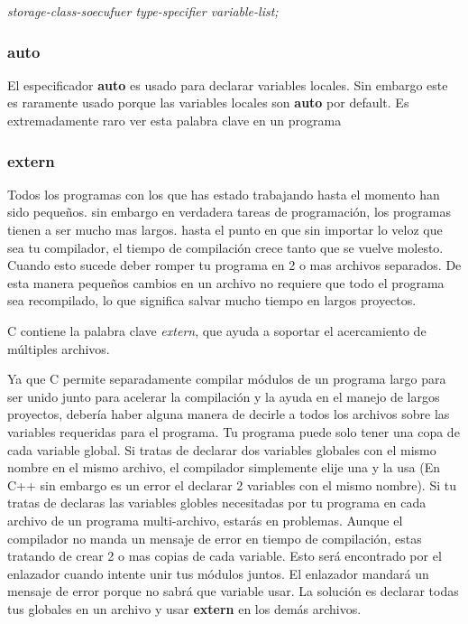 \documentclass[]{article}
\begin{document}
	\textit{storage-class-soecufuer type-specifier variable-list;}\\
	
	\subsubsection{auto}
	
	El especificador \textbf{auto} es usado para declarar variables locales. Sin embargo este es raramente usado porque las variables locales son \textbf{auto} por default. Es extremadamente raro ver esta palabra clave en un programa
	
	\subsubsection{extern}
	
	Todos los programas con los que has estado trabajando hasta el momento han sido pequeños. sin embargo en verdadera tareas de programación, los programas tienen a ser mucho mas largos. hasta el punto en que sin importar lo veloz que sea tu compilador, el tiempo de compilación crece tanto que se vuelve molesto. Cuando esto sucede deber romper tu programa en 2 o mas archivos separados. De esta manera pequeños cambios en un archivo no requiere que todo el programa sea recompilado, lo que significa salvar mucho tiempo en largos proyectos.
	
	C contiene la palabra clave \textit{extern}, que ayuda a soportar el acercamiento de múltiples archivos.
	
	Ya que C permite separadamente compilar módulos de un programa largo para ser unido junto para acelerar la compilación y la ayuda en el manejo de largos proyectos, debería haber alguna manera de decirle a todos los archivos sobre las variables requeridas para el programa. Tu programa puede solo tener una copa de cada variable global. Si tratas de declarar dos variables globales con el mismo nombre en el mismo archivo, el compilador simplemente elije una y la usa (En C++ sin embargo es un error el declarar 2 variables con el mismo nombre). Si tu tratas de declaras las variables globles necesitadas por tu programa en cada archivo de un programa multi-archivo, estarás en problemas. Aunque el compilador no manda un mensaje de error en tiempo de compilación, estas tratando de crear 2 o mas copias de cada variable. Esto será encontrado por el enlazador cuando intente unir tus módulos juntos. El enlazador mandará un mensaje de error porque no sabrá que variable usar. La solución es declarar todas tus globales en un archivo y usar \textbf{extern} en los demás archivos.
	
\end{document}
